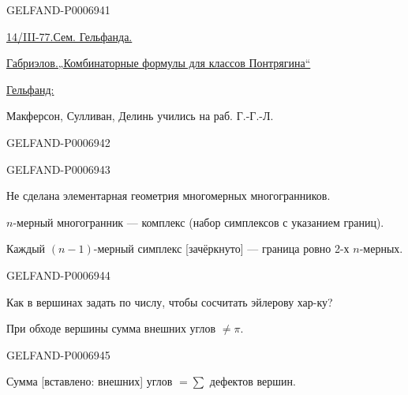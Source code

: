 \begin{GelfandAdjacentEvidence}{GELFAND-P000694}{1}

\underline{14/III-77.}\qquad\underline{Сем. Гельфанда.}

\underline{Габриэлов.}\qquad\underline{„Комбинаторные формулы для классов Понтрягина“}

\underline{Гельфанд:}

Макферсон, Сулливан, Делинь учились на раб. Г.-Г.-Л.
\end{GelfandAdjacentEvidence}
\begin{GelfandAdjacentEvidence}{GELFAND-P000694}{2}

\end{GelfandAdjacentEvidence}
\begin{GelfandAdjacentEvidence}{GELFAND-P000694}{3}


Не сделана элементарная геометрия многомерных многогранников.

\(n\)-мерный многогранник --- комплекс (набор симплексов с указанием границ).

Каждый \((n-1)\)-мерный симплекс [зачёркнуто] --- граница ровно 2-х \(n\)-мерных.
\end{GelfandAdjacentEvidence}
\begin{GelfandAdjacentEvidence}{GELFAND-P000694}{4}


Как в вершинах задать по числу, чтобы сосчитать эйлерову хар-ку?

При обходе вершины сумма внешних углов \(\ne\pi\).
\end{GelfandAdjacentEvidence}
\begin{GelfandAdjacentEvidence}{GELFAND-P000694}{5}

Сумма [вставлено: внешних] углов \(=\sum\) дефектов вершин.
\end{GelfandAdjacentEvidence}
